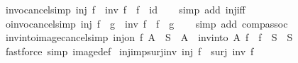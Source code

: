 \begin{isabellebody}
\endisatagproof
{\isafoldproof}%
%
\isadelimproof
\isanewline
%
\endisadelimproof
\isanewline
{}\isamarkupfalse%
\ inv{\isacharunderscore}{\kern0pt}o{\isacharunderscore}{\kern0pt}cancel{\isacharbrackleft}{\kern0pt}simp{\isacharbrackright}{\kern0pt}{\isacharcolon}{\kern0pt}\ {\isachardoublequoteopen}inj\ f\ {\isasymLongrightarrow}\ inv\ f\ {\isasymcirc}\ f\ {\isacharequal}{\kern0pt}\ id{\isachardoublequoteclose}\isanewline
%
\isadelimproof
\ \ %
\endisadelimproof
%
\isatagproof
{}\isamarkupfalse%
\ {\isacharparenleft}{\kern0pt}simp\ add{\isacharcolon}{\kern0pt}\ inj{\isacharunderscore}{\kern0pt}iff{\isacharparenright}{\kern0pt}%
\endisatagproof
{\isafoldproof}%
%
\isadelimproof
\isanewline
%
\endisadelimproof
\isanewline
{}\isamarkupfalse%
\ o{\isacharunderscore}{\kern0pt}inv{\isacharunderscore}{\kern0pt}o{\isacharunderscore}{\kern0pt}cancel{\isacharbrackleft}{\kern0pt}simp{\isacharbrackright}{\kern0pt}{\isacharcolon}{\kern0pt}\ {\isachardoublequoteopen}inj\ f\ {\isasymLongrightarrow}\ g\ {\isasymcirc}\ inv\ f\ {\isasymcirc}\ f\ {\isacharequal}{\kern0pt}\ g{\isachardoublequoteclose}\isanewline
%
\isadelimproof
\ \ %
\endisadelimproof
%
\isatagproof
{}\isamarkupfalse%
\ {\isacharparenleft}{\kern0pt}simp\ add{\isacharcolon}{\kern0pt}\ comp{\isacharunderscore}{\kern0pt}assoc{\isacharparenright}{\kern0pt}%
\endisatagproof
{\isafoldproof}%
%
\isadelimproof
\isanewline
%
\endisadelimproof
\isanewline
{}\isamarkupfalse%
\ inv{\isacharunderscore}{\kern0pt}into{\isacharunderscore}{\kern0pt}image{\isacharunderscore}{\kern0pt}cancel{\isacharbrackleft}{\kern0pt}simp{\isacharbrackright}{\kern0pt}{\isacharcolon}{\kern0pt}\ {\isachardoublequoteopen}inj{\isacharunderscore}{\kern0pt}on\ f\ A\ {\isasymLongrightarrow}\ S\ {\isasymsubseteq}\ A\ {\isasymLongrightarrow}\ inv{\isacharunderscore}{\kern0pt}into\ A\ f\ {\isacharbackquote}{\kern0pt}\ f\ {\isacharbackquote}{\kern0pt}\ S\ {\isacharequal}{\kern0pt}\ S{\isachardoublequoteclose}\isanewline
%
\isadelimproof
\ \ %
\endisadelimproof
%
\isatagproof
{}\isamarkupfalse%
\ {\isacharparenleft}{\kern0pt}fastforce\ simp{\isacharcolon}{\kern0pt}\ image{\isacharunderscore}{\kern0pt}def{\isacharparenright}{\kern0pt}%
\endisatagproof
{\isafoldproof}%
%
\isadelimproof
\isanewline
%
\endisadelimproof
\isanewline
{}\isamarkupfalse%
\ inj{\isacharunderscore}{\kern0pt}imp{\isacharunderscore}{\kern0pt}surj{\isacharunderscore}{\kern0pt}inv{\isacharcolon}{\kern0pt}\ {\isachardoublequoteopen}inj\ f\ {\isasymLongrightarrow}\ surj\ {\isacharparenleft}{\kern0pt}inv\ f{\isacharparenright}{\kern0pt}{\isachardoublequoteclose}\isanewline

\end{isabellebody}
